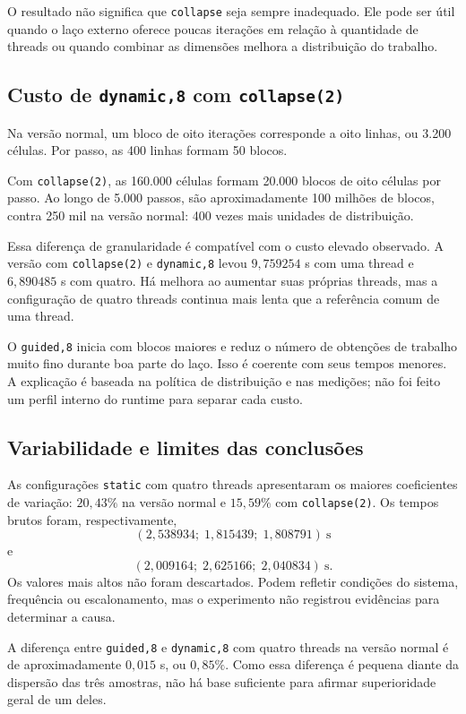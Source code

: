 \documentclass[12pt,a4paper]{article}
\begin{document}
O resultado não significa que \texttt{collapse} seja sempre inadequado. Ele pode ser útil quando o laço externo oferece poucas iterações em relação à quantidade de threads ou quando combinar as dimensões melhora a distribuição do trabalho.

\subsection{Custo de \texttt{dynamic,8} com \texttt{collapse(2)}}
Na versão normal, um bloco de oito iterações corresponde a oito linhas, ou 3.200 células. Por passo, as 400 linhas formam 50 blocos.

Com \texttt{collapse(2)}, as 160.000 células formam 20.000 blocos de oito células por passo. Ao longo de 5.000 passos, são aproximadamente 100 milhões de blocos, contra 250 mil na versão normal: 400 vezes mais unidades de distribuição.

Essa diferença de granularidade é compatível com o custo elevado observado. A versão com \texttt{collapse(2)} e \texttt{dynamic,8} levou $9{,}759254$ s com uma thread e $6{,}890485$ s com quatro. Há melhora ao aumentar suas próprias threads, mas a configuração de quatro threads continua mais lenta que a referência comum de uma thread.

O \texttt{guided,8} inicia com blocos maiores e reduz o número de obtenções de trabalho muito fino durante boa parte do laço. Isso é coerente com seus tempos menores. A explicação é baseada na política de distribuição e nas medições; não foi feito um perfil interno do runtime para separar cada custo.

\subsection{Variabilidade e limites das conclusões}
As configurações \texttt{static} com quatro threads apresentaram os maiores coeficientes de variação: $20{,}43\%$ na versão normal e $15{,}59\%$ com \texttt{collapse(2)}. Os tempos brutos foram, respectivamente,
\[
(2{,}538934;\;1{,}815439;\;1{,}808791)\ \mathrm{s}
\]
e
\[
(2{,}009164;\;2{,}625166;\;2{,}040834)\ \mathrm{s}.
\]
Os valores mais altos não foram descartados. Podem refletir condições do sistema, frequência ou escalonamento, mas o experimento não registrou evidências para determinar a causa.

A diferença entre \texttt{guided,8} e \texttt{dynamic,8} com quatro threads na versão normal é de aproximadamente $0{,}015$ s, ou $0{,}85\%$. Como essa diferença é pequena diante da dispersão das três amostras, não há base suficiente para afirmar superioridade geral de um deles.
\end{document}
